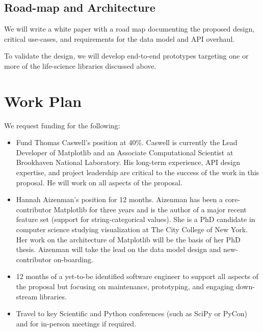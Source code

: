 \documentclass[11pt,letterpaper]{article}  %
\begin{document}
\subsection{Road-map and Architecture}

We will write a white paper with a road map documenting the proposed
design, critical use-cases, and requirements for the data model and
API overhaul.

To validate the design, we will develop end-to-end prototypes
targeting one or more of the life-science libraries discussed above.


\section{Work Plan}

We request funding for the following:


\begin{itemize}[noitemsep]

\item Fund Thomas Caswell's position at 40\%.  Caswell is
  currently the Lead Developer of Matplotlib and an Associate
  Computational Scientist at Brookhaven National Laboratory.  His
  long-term experience, API design expertise, and project leadership
  are critical to the success of the work in this proposal.  He will work
  on all aspects of the proposal.
\item Hannah Aizenman's position for 12 months.  Aizenman has
  been a core-contributor Matplotlib for three years and is the author
  of a major recent feature set (support for string-categorical values).  She
  is a PhD candidate in computer science studying visualization at The
  City College of New York.  Her work on the architecture of
  Matplotlib will be the basis of her PhD thesis.  Aizenman will take
  the lead on the data model design and new-contributor on-boarding.
\item 12 months of a yet-to-be identified software engineer to
  support all aspects of the proposal but focusing on maintenance,
  prototyping, and engaging down-stream libraries.
\item Travel to key Scientific and Python conferences (such as SciPy
  or PyCon) and for in-person meetings if required.
\end{itemize}
\end{document}
